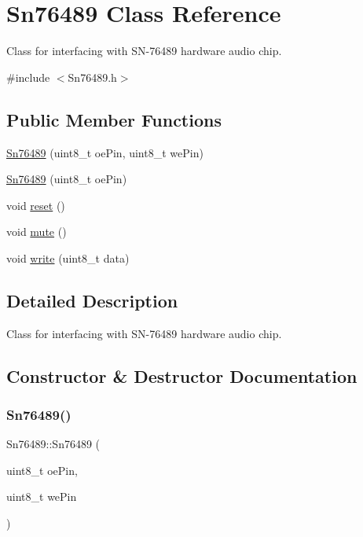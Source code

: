 \hypertarget{classSn76489}{}\section{Sn76489 Class Reference}
\label{classSn76489}


Class for interfacing with S\+N-\/76489 hardware audio chip.  




{\ttfamily \#include $<$Sn76489.\+h$>$}

\subsection*{Public Member Functions}
\begin{DoxyCompactItemize}
\item 
\mbox{\hyperlink{classSn76489_adaca4f1b936a9cc43405391f3f442696}{Sn76489}} (uint8\+\_\+t oe\+Pin, uint8\+\_\+t we\+Pin)
\item 
\mbox{\hyperlink{classSn76489_aabb1ef1f5c22859a40def06b66dca93f}{Sn76489}} (uint8\+\_\+t oe\+Pin)
\item 
void \mbox{\hyperlink{classSn76489_a904bb7ddb48bb425181bcdae443c49fb}{reset}} ()
\item 
void \mbox{\hyperlink{classSn76489_af292b88ad1659a1fd58a51bddb0cc1dc}{mute}} ()
\item 
void \mbox{\hyperlink{classSn76489_a5add4d0735cd8edbd03eb1c54bd09532}{write}} (uint8\+\_\+t data)
\end{DoxyCompactItemize}


\subsection{Detailed Description}
Class for interfacing with S\+N-\/76489 hardware audio chip. 

\subsection{Constructor \& Destructor Documentation}
\mbox{\label{classSn76489_adaca4f1b936a9cc43405391f3f442696}} 
\subsubsection{\texorpdfstring{Sn76489()}{Sn76489()}\hspace{0.1cm}{\footnotesize\ttfamily [1/2]}}
{\footnotesize\ttfamily Sn76489\+::\+Sn76489 (\begin{DoxyParamCaption}\item[{uint8\+\_\+t}]{oe\+Pin,  }\item[{uint8\+\_\+t}]{we\+Pin }\end{DoxyParamCaption})}

